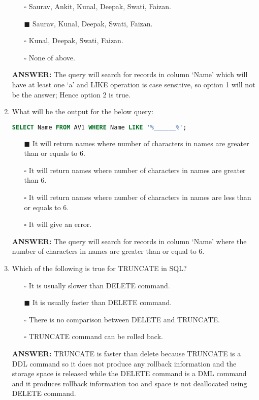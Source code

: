 \documentclass[10pt]{article}
\begin{document}
\begin{enumerate}
			\begin{enumerate}
				\item[$\square$]  Saurav, Ankit, Kunal, Deepak, Swati, Faizan.
				\item[$\blacksquare$] Saurav, Kunal, Deepak, Swati, Faizan.
				\item[$\square$]  Kunal, Deepak, Swati, Faizan.
				\item[$\square$]  None of above.
			\end{enumerate}
			\color{red} \textbf{ANSWER:} \color{black} The query will search for records in column ‘Name’ which will have at least one ‘a’ and LIKE operation is case sensitive, so option 1 will not be the answer; Hence option 2 is true.

		\item What will be the output for the below query:
			\begin{lstlisting}[language=SQL,firstline=1, lastline=1] 
				SELECT Name FROM AV1 WHERE Name LIKE '%______%';
			\end{lstlisting}

			\begin{enumerate}
				\item[$\blacksquare$] It will return names where number of characters in names are greater than or equals to 6.
				\item[$\square$] It will return names where number of characters in names are greater than 6.
				\item[$\square$] It will return names where number of characters in names are less than or equals to 6.
				\item[$\square$] It will give an error.
			\end{enumerate}
			\color{red} \textbf{ANSWER:} \color{black} The query will search for records in column ‘Name’ where the number of characters in names are greater than or equal to 6.

		\item Which of the following is true for TRUNCATE in SQL?
			\begin{enumerate}
				\item[$\square$] It is usually slower than DELETE command.
				\item[$\blacksquare$] It is usually faster than DELETE command.
				\item[$\square$] There is no comparison between DELETE and TRUNCATE.
				\item[$\square$] TRUNCATE command can be rolled back.
			\end{enumerate}
			\color{red} \textbf{ANSWER:} \color{black} TRUNCATE is faster than delete because TRUNCATE is a DDL command so it does not produce any rollback information and the storage space is released while the DELETE command is a DML command and it produces rollback information too and space is not deallocated using DELETE command.


\end{enumerate}
\end{document}
